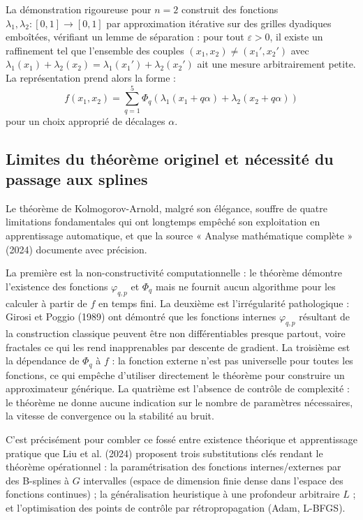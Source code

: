 \documentclass[11pt,a4paper,oneside]{report}
\theoremstyle{definition}
\theoremstyle{remark}
\begin{document}
La démonstration rigoureuse pour $n=2$ construit des fonctions $\lambda_1, \lambda_2 : [0,1] \rightarrow [0,1]$ par approximation itérative sur des grilles dyadiques emboîtées, vérifiant un lemme de séparation : pour tout $\varepsilon > 0$, il existe un raffinement tel que l'ensemble des couples $(x_1, x_2) \neq (x_1', x_2')$ avec $\lambda_1(x_1) + \lambda_2(x_2) = \lambda_1(x_1') + \lambda_2(x_2')$ ait une mesure arbitrairement petite. La représentation prend alors la forme :
\begin{equation}
f(x_1, x_2) = \sum_{q=1}^{5} \Phi_q\left(\lambda_1(x_1 + q\alpha) + \lambda_2(x_2 + q\alpha)\right)
\end{equation}
pour un choix approprié de décalages $\alpha$.

\subsection{Limites du théorème originel et nécessité du passage aux splines}

Le théorème de Kolmogorov-Arnold, malgré son élégance, souffre de quatre limitations fondamentales qui ont longtemps empêché son exploitation en apprentissage automatique, et que la source « Analyse mathématique complète » (2024) documente avec précision.

La première est la non-constructivité computationnelle : le théorème démontre l'existence des fonctions $\varphi_{q,p}$ et $\Phi_q$ mais ne fournit aucun algorithme pour les calculer à partir de $f$ en temps fini. La deuxième est l'irrégularité pathologique : Girosi et Poggio (1989) ont démontré que les fonctions internes $\varphi_{q,p}$ résultant de la construction classique peuvent être non différentiables presque partout, voire fractales  ce qui les rend inapprenables par descente de gradient. La troisième est la dépendance de $\Phi_q$ à $f$ : la fonction externe n'est pas universelle pour toutes les fonctions, ce qui empêche d'utiliser directement le théorème pour construire un approximateur générique. La quatrième est l'absence de contrôle de complexité : le théorème ne donne aucune indication sur le nombre de paramètres nécessaires, la vitesse de convergence ou la stabilité au bruit.

C'est précisément pour combler ce fossé entre existence théorique et apprentissage pratique que Liu et al. (2024) proposent trois substitutions clés rendant le théorème opérationnel : la paramétrisation des fonctions internes/externes par des B-splines à $G$ intervalles (espace de dimension finie dense dans l'espace des fonctions continues) ; la généralisation heuristique à une profondeur arbitraire $L$ ; et l'optimisation des points de contrôle par rétropropagation (Adam, L-BFGS).
\end{document}
